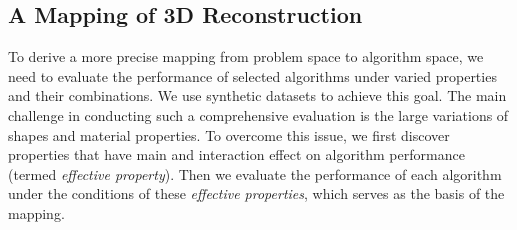 
\subsection{A Mapping of 3D Reconstruction}
To derive a more precise mapping from problem space to algorithm space, we need to evaluate the performance of selected algorithms under varied properties and their combinations. We use synthetic datasets to achieve this goal. The main challenge in conducting such a comprehensive evaluation is the large variations of shapes and material properties. To overcome this issue, we first discover properties that have main and interaction effect on algorithm performance (termed \textit{effective property}). Then we evaluate the performance of each algorithm under the conditions of these \textit{effective properties}, which serves as the basis of the mapping.




